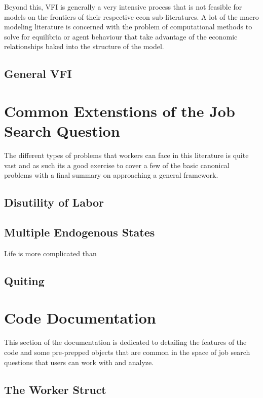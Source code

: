 \documentclass[11pt,english]{article}
\begin{document}
\noindent Beyond this, VFI is generally a very intensive process that is not feasible for models on the frontiers of their respective econ sub-literatures. A lot of the macro modeling literature is concerned with the problem of computational methods to solve for equilibria or agent behaviour that take advantage of the economic relationships baked into the structure of the model.

\subsection{General VFI}

\section{Common Extenstions of the Job Search Question}

The different types of problems that workers can face in this literature is quite vast and as such its a good exercise to cover a few of the basic canonical problems with a final summary on approaching a general framework.

\subsection{Disutility of Labor}


\subsection{Multiple Endogenous States}
Life is more complicated than 


\subsection{Quiting}


\section{Code Documentation}

This section of the documentation is dedicated to detailing the features of the code and some pre-prepped objects that are common in the space of job search questions that users can work with and analyze.

\subsection{The Worker Struct}
\end{document}
